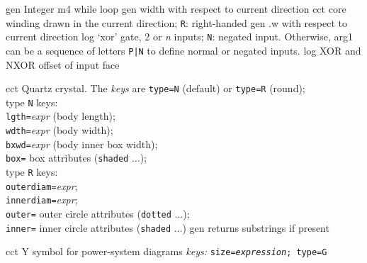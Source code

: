 %

%
  {gen}%
  {Integer m4 while loop}%
%
  {gen}%
  {width with respect to current direction}%
%
  {cct}%
  {core winding drawn in the current direction; {\tt R}: right-handed
   }%
%
  {gen}%
  {.w with respect to current direction}%
%
  {log}%
  {`xor' gate, 2 or {\sl n\/} inputs; {\tt N}: negated input.
   Otherwise, arg1 can be a sequence of letters {\tt P|N} to define
   normal or negated inputs.
    }%
%
  {log}%
  {XOR and NXOR offset of input face}%

%

%
  {cct}%
  {Quartz crystal. The {\sl keys} are
     {\tt type=N} (default) or {\tt type=R} (round);\\
            type {\tt N} keys:\\
              {\tt lgth=}{\sl expr} (body length);\\
              {\tt wdth=}{\sl expr} (body width);\\
              {\tt bxwd=}{\sl expr} (body inner box width);\\
              {\tt box=} box attributes ({\tt shaded} $\ldots$);\\
            type {\tt R} keys:\\
              {\tt outerdiam=}{\sl expr};\\
              {\tt innerdiam=}{\sl expr};\\
              {\tt outer=} outer circle attributes ({\tt dotted} $\ldots$);\\
              {\tt inner=} inner circle attributes ({\tt shaded} $\ldots$)%
}%
%
  {gen}%
  {returns substrings if present}%

%

%
  {cct}%
  {Y symbol for power-system diagrams
   {\sl keys:} {\tt size={\sl expression}; type=G}}%

%

